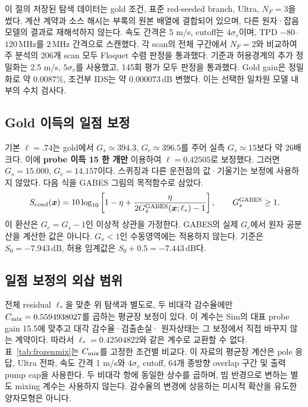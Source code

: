 \documentclass[11pt,a4paper]{article}
\newcommand{\dB}{\,\mathrm{dB}}
\newcommand{\MHz}{\,\mathrm{MHz}}
\begin{document}
이 절의 저장된 탐색 데이터는 gold 조건, 표준 red-seeded branch, Ultra, $N_F=3$을 썼다.
계산 계약과 소스 해시는 부록의 원본 배열에 결합되어 있으며, 다른 원자·잡음 모델의 결과로 재해석하지 않는다.
속도 간격은 5 m/s, cutoff는 $4\sigma_v$이며, TPD
$-80$--$120\MHz$를 $2\MHz$ 간격으로 스캔했다. 각 scan의 전체 구간에서
$N_F=2$와 비교하여 주 분석의 206개 scan 모두 Floquet 수렴 판정을 통과했다.
기준과 허용경계의 추가 정밀화는 2.5 m/s, $5\sigma_v$를 사용했고, 145회
평가 모두 판정을 통과했다. Gold gain은 정밀화로 약 $0.0087\%$,
조건부 IDS는 약 $0.000073\dB$ 변했다. 이는 선택한 일차원 모델 내부의
수치 검사다.

\subsection{Gold 이득의 일점 보정}
기본 $\ell=.74$는 gold에서 $G_s\simeq394.3$, $G_c\simeq396.5$를
주어 실측 $G_s\simeq15$보다 약 26배 크다. 이에 \textbf{probe 이득 15
한 개만} 이용하여 $\ell=0.42505$로 보정했다. 그러면
$G_s=15.000$, $G_c=14.157$이다. 스퀴징과 다른 운전점의 값·기울기는
보정에 사용하지 않았다. 다음 식을 GABES 그림의 목적함수로 삼았다.
\begin{equation}
 S_{\rm cond}(\bm x)=10\log_{10}
 \left[1-\eta+\frac{\eta}{2G_s^{\rm GABES}(\bm x;\ell_*)-1}\right],
 \qquad G_s^{\rm GABES}\geq1.
 \label{eq:conditional}
\end{equation}
이 환산은 $G_c=G_s-1$인 이상적 상관을 가정한다. GABES의 실제 $G_c$에서
원자 공분산을 계산한 값은 아니다. $G_s<1$인 수동영역에는 적용하지 않는다.
기준은 $S_0=-7.943\dB$, 허용 임계값은 $S_0+0.5=-7.443\dB$다.


\subsection{일점 보정의 외삽 범위}
전체 residual $\ell_*$을 맞춘 위 탐색과 별도로, 두 비대각 감수율에만
$C_{\rm mix}=0.5594938027$를 곱하는 평균장 보정이 있다.
이 계수는 Sim의 대표 probe gain 15.5에 맞추고 대각 감수율·검출손실·
원자상태는 그 보정에서 직접 바꾸지 않는 계약이다. 따라서
$\ell_*=0.42504822$와 같은 계수로 교환할 수 없다. 표~\ref{tab:frozenmix}는
$C_{\rm mix}$를 고정한 조건별 비교다. 이 자료의 평균장 계산은
pole 응답, Ultra 전파, 속도 간격 1 m/s와 $4\sigma_v$ cutoff,
64개 종방향 overlap 구간 및 출력 pump cap을 사용한다. 두 비대각 항에
동일한 상수를 곱하며, 빔 반경으로 변하는 별도 mixing 계수는 사용하지 않는다.
감수율의 변경에 상응하는 미시적 확산을 유도한 양자모형은 아니다.
\end{document}
